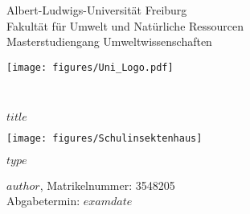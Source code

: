 \documentclass[a4paper,11pt]{article}
\newcommand{\thesistype}{$type$}
\begin{document}
	\thispagestyle{empty}
	
	\raggedright
	
	\begin{center}
		
		\begin{minipage}{0.8\textwidth}%
			{\large{ \begin{flushleft}Albert-Ludwigs-Universität Freiburg \\
						Fakultät für Umwelt und Natürliche Ressourcen \\
						Masterstudiengang Umweltwissenschaften \\%
					\end{flushleft}
				}
			}
		\end{minipage}%
		\hspace{0.5cm}
		\begin{minipage}{0.15\textwidth}%
			\texttt{[image: figures/Uni\_Logo.pdf]}
		\end{minipage} \\ \vspace*{\fill}
		
		
		
		\Large{$title$} \\ \vspace*{\fill}
		
		\texttt{[image: figures/Schulinsektenhaus]}
		
		
		\large{\thesistype{}} \\ \vspace*{\fill}
		
		
		\large{$author$, Matrikelnummer: 3548205} \\
		\large{Abgabetermin: $examdate$}
		
	\end{center}
	\newpage\null\thispagestyle{empty}\newpage
	
	
	\newpage
	\thispagestyle{empty}
	
\end{document}
